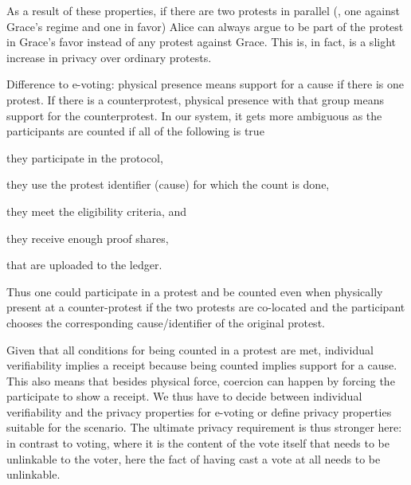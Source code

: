 As a result of these properties, if there are two protests in parallel (\eg, one against Grace's regime and one in favor) Alice can always argue to be part of the protest in Grace's favor instead of any protest against Grace.
This is, in fact, is a slight increase in privacy over ordinary protests.


Difference to e-voting:
physical presence means support for a cause if there is one protest. If there is a counterprotest, physical presence with that group means support for the counterprotest. In our system, it gets more ambiguous as the participants are counted if all of the following is true
\begin{enumerate*}
\item they participate in the protocol,
\item they use the protest identifier (cause) for which the count is done,
\item they meet the eligibility criteria, and
\item they receive enough proof shares,
\item that are uploaded to the ledger.
\end{enumerate*}
Thus one could participate in a protest and be counted even when physically 
present at a counter-protest if the two protests are co-located and the 
participant chooses the corresponding cause/identifier of the original protest.

Given that all conditions for being counted in a protest are met, individual 
verifiability implies a receipt  because being counted implies support for a cause. 
This also means that besides physical force, coercion can happen by forcing the 
participate to show a receipt. 
We thus have to decide between individual verifiability and the privacy 
properties for e-voting or define privacy properties suitable for the scenario. 
The ultimate privacy requirement is thus stronger here: in contrast to voting, 
where it is the content of the vote itself that needs to be unlinkable to the 
voter, here the fact of having cast a vote at all needs to be unlinkable.

